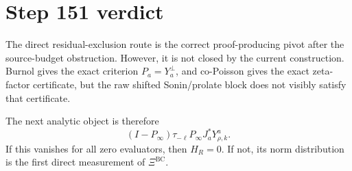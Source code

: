 \documentclass[11pt]{article}
\newcommand{\BC}{\mathrm{BC}}
\begin{document}
\section{Step 151 verdict}

The direct residual-exclusion route is the correct proof-producing pivot after the source-budget obstruction. However, it is not closed by the current construction. Burnol gives the exact criterion \(P_a=Y_a^\perp\), and co-Poisson gives the exact zeta-factor certificate, but the raw shifted Sonin/prolate block does not visibly satisfy that certificate.

The next analytic object is therefore
\[
        \boxed{
        (I-P_\infty)\tau_{-\ell}P_\infty J_a^*Y^a_{\rho,k}.
        }
\]
If this vanishes for all zero evaluators, then \(H_R=0\). If not, its norm distribution is the first direct measurement of \(\Xi^{\BC}\).
\end{document}
